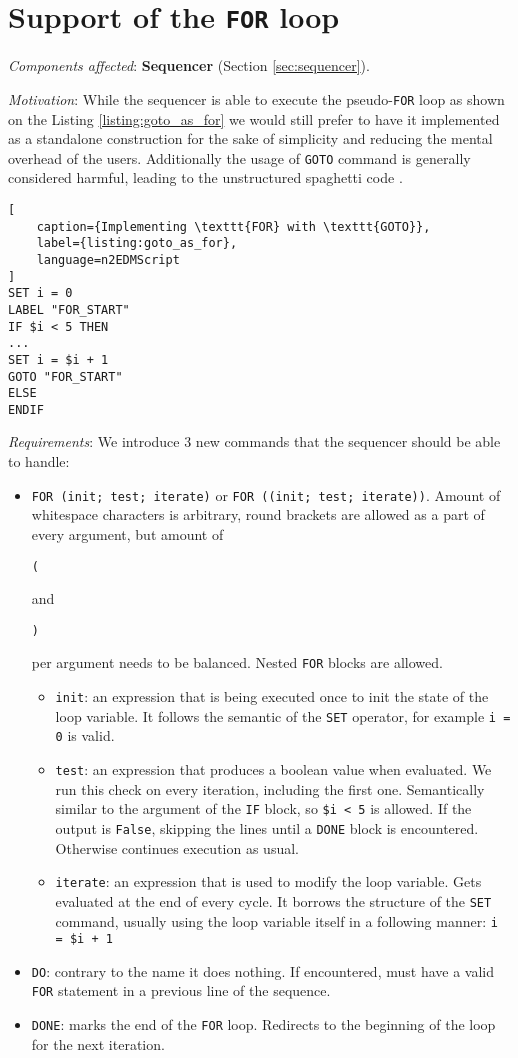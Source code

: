 \section{Support of the \texttt{FOR} loop}
\label{sec:for_loop}

\textit{Components affected}: \textbf{Sequencer} (Section \ref{sec:sequencer}).

\textit{Motivation}: While the sequencer is able to execute the pseudo-\texttt{FOR} loop as shown on the Listing \ref{listing:goto_as_for} we would still prefer to have it implemented as a standalone construction for the sake of simplicity and reducing the mental overhead of the users. Additionally the usage of \texttt{GOTO} command is generally considered \cite{Dijkstra1968} harmful, leading to the unstructured spaghetti code \cite{Cram2005}.

\begin{lstlisting}[
	caption={Implementing \texttt{FOR} with \texttt{GOTO}}, 
	label={listing:goto_as_for}, 
	language=n2EDMScript
]
SET i = 0
LABEL "FOR_START"
IF $i < 5 THEN
...
SET i = $i + 1
GOTO "FOR_START"
ELSE
ENDIF
\end{lstlisting}

\textit{Requirements}: We introduce 3 new commands that the sequencer should be able to handle:

\begin{itemize}
	\item \texttt{FOR (init; test; iterate)} or \texttt{FOR ((init; test; iterate))}. Amount of whitespace characters is arbitrary, round brackets are allowed as a part of every argument, but amount of \colorbox{selectioncolor}{\strut \texttt{(}} and \colorbox{selectioncolor}{\strut \texttt{)}} per argument needs to be balanced. Nested \texttt{FOR} blocks are allowed.
	\begin{itemize}
		\item \texttt{init}: an expression that is being executed once to init the state of the loop variable. It follows the semantic of the \texttt{SET} operator, for example \texttt{i = 0} is valid.
		\item \texttt{test}: an expression that produces a boolean value when evaluated. We run this check on every iteration, including the first one. Semantically similar to the argument of the \texttt{IF} block, so \texttt{\$i < 5} is allowed. If the output is \texttt{False}, skipping the lines until a \texttt{DONE} block is encountered. Otherwise continues execution as usual.
		\item \texttt{iterate}: an expression that is used to modify the loop variable. Gets evaluated at the end of every cycle. It borrows the structure of the \texttt{SET} command, usually using the loop variable itself in a following manner: \texttt{i = \$i + 1}
	\end{itemize}
	\item \texttt{DO}: contrary to the name it does nothing. If encountered, must have a valid \texttt{FOR} statement in a previous line of the sequence.
	\item \texttt{DONE}: marks the end of the \texttt{FOR} loop. Redirects to the beginning of the loop for the next iteration.
\end{itemize}

